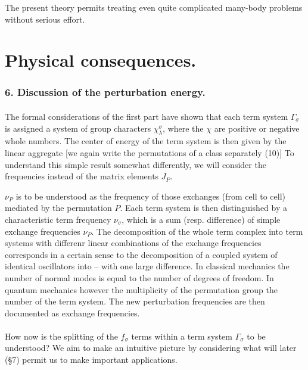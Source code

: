 \begin{paper}{1}
The present theory permits treating even quite complicated many-body problems without serious effort.

\part{Physical consequences.}

\section*{6. Discussion of the perturbation energy.} \subsection{} The formal considerations of the first part have shown that each term system $\Gamma_\sigma$ is assigned a system of group characters $\chi_\lambda^\sigma$, where the $\chi$ are positive or negative whole numbers. The center of energy of the term system is then given by the linear aggregate [we again write the permutations of a class separately (10)]
To understand this simple result somewhat differently, we will consider the frequencies
instead of the matrix elements $J_P$.

$\nu_P$ is to be understood as the frequency of those exchanges (from cell to cell) mediated by the permutation $P$. Each term system is then distinguished by a characteristic term frequency $\nu_\sigma$, which is a sum (resp. difference) of simple exchange frequencies $\nu_P$. The decomposition of the whole term complex into term systems with differenr linear combinations of the exchange frequencies corresponds in a certain sense to the decomposition of a coupled system of identical oscillators into  -- with one large difference. In classical mechanics the number of normal modes is equal to the number of degrees of freedom. In quantum mechanics however the multiplicity of the permutation group  the number of the term system. The new perturbation frequencies are then documented as exchange frequencies.

\subsection{} How now is the splitting of the $f_\sigma$ terms within a term system $\Gamma_\sigma$ to be understood? We aim to make an intuitive picture  by considering what will later (\S7) permit us to make important applications.


\end{paper}
